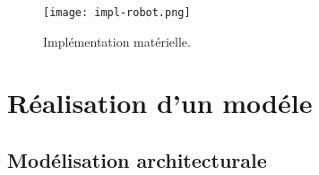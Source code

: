 \documentclass{beamer}
\begin{document}
      \begin{frame}
        \frametitle{\secname}

        \begin{figure}
          \centering
          \texttt{[image: impl-robot.png]}
          \caption{Implémentation matérielle.}
        \end{figure}
      \end{frame}

  \section{Réalisation d'un modéle}
    \subsection{Modélisation architecturale}
\end{document}

